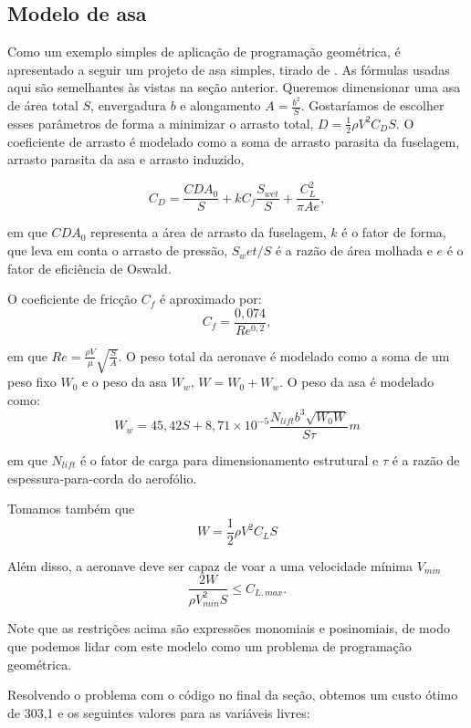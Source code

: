 \documentclass{article}
\begin{document}
\subsection{Modelo de asa}
Como um exemplo simples de aplicação de programação geométrica, é
apresentado a seguir um projeto de asa simples, tirado de
\cite{warren}. As fórmulas usadas aqui são semelhantes às vistas na
seção anterior.  Queremos dimensionar uma asa de área total $S$,
envergadura $b$ e alongamento $A = \frac{b^2}{S}$. Gostaríamos de
escolher esses parâmetros de forma a minimizar o arrasto total, $D =
\frac{1}{2}\rho V^2 C_D S$.  O coeficiente de arrasto é modelado como
a soma de arrasto parasita da fuselagem, arrasto parasita da asa e
arrasto induzido,

\[
  C_D = \frac{CDA_0}{S} + kC_f \frac{S_{wet}}{S} + \frac{C_{L}^2}{\pi A
    e},
\]

\noindent em que $CDA_0$ representa a área de arrasto da fuselagem,
$k$ é o fator de forma, que leva em conta o arrasto de pressão,
$S_wet/S$ é a razão de área molhada e $e$ é o fator de eficiência de
Oswald.

O coeficiente de fricção $C_f$ é aproximado por:
\[
  C_f = \frac{0,074}{Re^{0,2}},
\]

\noindent em que $Re = \frac{\rho V}{\mu} \sqrt{\frac{S}{A}}$. O peso
total da aeronave é modelado como a soma de um peso fixo $W_0$ e o
peso da asa $W_w$, $W = W_0 + W_w$. O peso da asa é modelado como:
\[
  W_w = 45,42S + 8,71\times10^{-5} \frac{N_{lift}b^3\sqrt{W_0W}}{S\tau}m
\]

\noindent em que $N_{lift}$ é o fator de carga para dimensionamento estrutural e
$\tau$ é a razão de espessura-para-corda do aerofólio.

Tomamos também que
\[
W = \frac{1}{2} \rho V^2 C_L S
\]

Além disso, a aeronave deve ser capaz de voar a uma velocidade mínima
$V_{min}$
\[
  \frac{2W}{\rho V_{min}^2 S} \leq C_{L,max}.
\]


Note que as restrições acima são expressões monomiais e posinomiais,
de modo que podemos lidar com este modelo como um problema de programação
geométrica.

Resolvendo o problema com o código no final da seção, obtemos um custo ótimo de 303,1 e os seguintes
valores para as variáveis livres:
\end{document}
